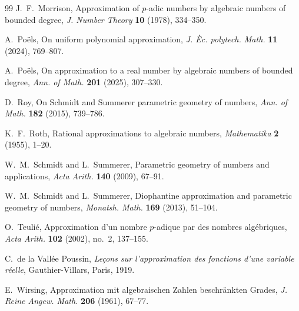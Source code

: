 \documentclass[12pt,reqno]{amsart}
\theoremstyle{definition}
\theoremstyle{remark}
\begin{document}
\begin{thebibliography}{99}
J.~F.~Morrison,
Approximation of $p$-adic numbers by algebraic numbers of bounded degree,
\emph{J. Number Theory} \textbf{10} (1978), 334--350.

A.~Po\"els,
On uniform polynomial approximation,
\emph{J. \`Ec. polytech. Math.} \textbf{11} (2024), 769--807.

A.~Po\"els,
On approximation to a real number by algebraic numbers of bounded degree,
\emph{Ann. of Math.} \textbf{201} (2025), 307--330.

D.~Roy,
On Schmidt and Summerer parametric geometry of numbers,
\emph{Ann. of Math.} \textbf{182} (2015), 739--786.

K.~F.~Roth,
Rational approximations to algebraic numbers,
\emph{Mathematika} \textbf{2} (1955), 1--20.

W.~M.~Schmidt and L.~Summerer,
Parametric geometry of numbers and applications,
\emph{Acta Arith.} \textbf{140} (2009), 67--91.

W.~M.~Schmidt and L.~Summerer,
Diophantine approximation and parametric geometry of numbers,
\emph{Monatsh. Math.} \textbf{169} (2013), 51--104.

O.~Teuli\'e,
Approximation d'un nombre $p$-adique par des nombres alg\'ebriques,
\emph{Acta Arith.} \textbf{102} (2002), no.~2, 137--155.

C.~de la Vall\'ee Poussin,
\emph{Le\c{c}ons sur l'approximation des fonctions d'une variable r\'eelle},
Gauthier-Villars, Paris, 1919.

E.~Wirsing,
Approximation mit algebraischen Zahlen beschr\"ankten Grades,
\emph{J. Reine Angew. Math.} \textbf{206} (1961), 67--77.

\end{thebibliography}
\end{document}
